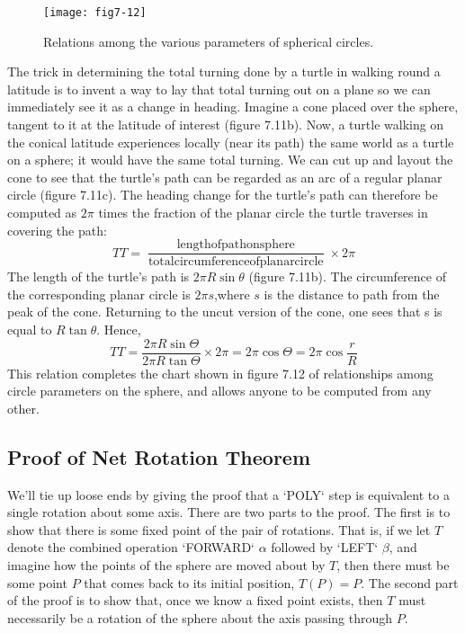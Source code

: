 \documentclass{book}
\begin{document}
\begin{figure}
\begin{center}
\texttt{[image: fig7-12]}
\caption{Relations among the various parameters of spherical circles.}
\end{center}
\end{figure}

The trick in determining the total turning done by a turtle in walking
round a latitude is to invent a way to lay that total turning out on a
plane so we can immediately see it as a change in heading. Imagine
a cone placed over the sphere, tangent to it at the latitude of interest
(figure 7.11b). Now, a turtle walking on the conical latitude experiences
locally (near its path) the same world as a turtle on a sphere; it would
have the same total turning. We can cut up and layout the cone to see
that the turtle's path can be regarded as an arc of a regular planar circle
(figure 7.11c). The heading change for the turtle's path can therefore be
computed as $2 \pi$ times the fraction of the planar circle the turtle traverses
in covering the path:
$$ TT = \frac {\operatorname{length of path on sphere}} {\operatorname{total circumference of planar circle}} \times 2 \pi $$
 The length of the turtle's path is $2 \pi R \sin \theta$ (figure 7.11b). The circumference of the corresponding planar circle is $2 \pi s$,where $s$ is the distance
to path from the peak of the cone. Returning to the uncut version of
the cone, one sees that s is equal to $R \tan \theta$. Hence,
$$TT = \frac{2 \pi R \sin \Theta} {2 \pi R \tan \Theta} \times 2 \pi = 2 \pi \cos \Theta = 2 \pi \cos \frac {r} {R} $$
 This relation completes the chart shown in figure 7.12 of relationships
among circle parameters on the sphere, and allows anyone to be computed from any other.

\subsection{Proof of Net Rotation Theorem}

We'll tie up loose ends by giving the proof that a \textsc{`POLY`} step is equivalent
to a single rotation about some axis. There are two parts to the proof.
The first is to show that there is some fixed point of the pair of rotations.
That is, if we let $T$ denote the combined operation \textsc{`FORWARD`} $\alpha$ followed
by \textsc{`LEFT`} $\beta$, and imagine how the points of the sphere are moved about
by $T$, then there must be some point $P$ that comes back to its initial
position, $T(P) = P$. The second part of the proof is to show that, once
we know a fixed point exists, then $T$ must necessarily be a rotation of
the sphere about the axis passing through $P$.
\end{document}
